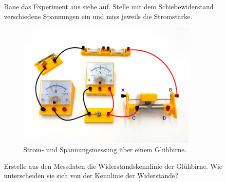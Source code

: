 \newpage
{}

Baue das Experiment aus siehe  auf. Stelle mit dem
Schiebewiderstand verschiedene Spannungen ein und miss jeweils die Stromstärke.


\begin{figure}[h!]
    \centering
    \includegraphics[width=9cm]{_images/ohm_lampe.pdf}
    \caption{Strom- und Spannungsmessung über einem Glühbirne.}
    \label{fig:ohm_lampe}
\end{figure}

Erstelle aus den Messdaten die Widerstandskennlinie der Glühbirne.
Wie unterscheiden sie sich von der Kennlinie der Widerstände?


